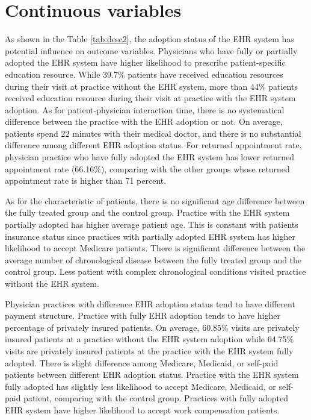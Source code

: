 \documentclass[12pt]{report}
\begin{document}
\section{Continuous variables}
As shown in the Table \ref{tab:desc2}, the adoption status of the EHR system has potential influence on outcome variables. Physicians who have fully or partially adopted the EHR system have higher likelihood to prescribe patient-specific education resource. While 39.7\% patients have received education resources during their visit at practice without the EHR system, more than 44\% patients received education resource during their visit at practice with the EHR system adoption. As for patient-physician interaction time, there is no systematical difference between the practice with the EHR adoption or not. On average, patients spend 22 minutes with their medical doctor, and there is no substantial difference among different EHR adoption status. For returned appointment rate, physician practice who have fully adopted the EHR system has lower returned appointment rate (66.16\%), comparing with the other groups whose returned appointment rate is higher than 71 percent.

As for the characteristic of patients, there is no significant age difference between the fully treated group and the control group. Practice with the EHR system partially adopted has higher average patient age. This is constant with patients insurance status since practices with partially adopted EHR system has higher likelihood to accept Medicare patients.  There is significant difference between the average number of chronological disease between the fully treated group and the control group. Less patient with complex chronological conditions visited practice without the EHR system. 

Physician practices with difference EHR adoption status tend to have different payment structure. Practice with fully EHR adoption tends to have higher percentage of privately insured patients. On average, 60.85\% visits are privately insured patients at a practice without the EHR system adoption while 64.75\% visits are privately insured patients at the practice with the EHR system fully adopted. There is slight difference among Medicare, Medicaid, or self-paid patients between different EHR adoption status. Practice with the EHR system fully adopted has slightly less likelihood to accept Medicare, Medicaid, or self-paid patient, comparing with the control group. Practices with fully adopted EHR system have higher likelihood to accept work compensation patients.
\end{document}
